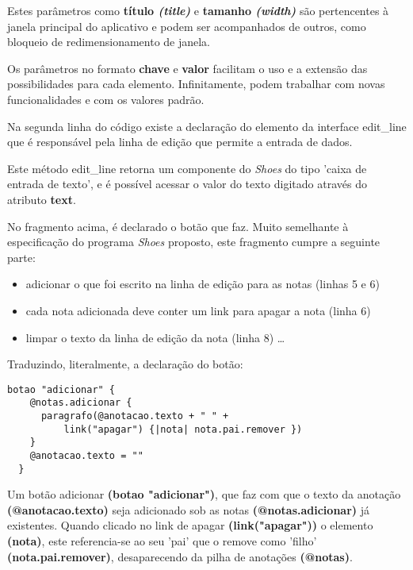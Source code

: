 \documentclass[espaco=simples,appendix=Name]{abnt}
\begin{document}
 

Estes parâmetros como \textbf{título \textit{(title)}} e \textbf{tamanho \textit{(width)}} são pertencentes à janela principal do aplicativo e podem ser acompanhados de outros, como bloqueio de redimensionamento de janela.

Os parâmetros no formato \textbf{chave} e \textbf{valor} facilitam o uso e a extensão das possibilidades para cada elemento. Infinitamente, podem trabalhar com novas funcionalidades e com os valores padrão.

Na segunda linha do código existe a declaração do elemento da interface edit\_line que é responsável pela linha de edição que permite a entrada de dados.
 

Este método edit\_line retorna um componente do \textit{Shoes} do tipo 'caixa de entrada de texto', e é possível acessar o valor do texto digitado através do atributo \textbf{text}. 

 

No fragmento acima, é declarado o botão que faz. Muito semelhante à especificação do programa \textit{Shoes} proposto, este fragmento cumpre a seguinte parte: 

\begin{itemize} 
  \item adicionar o que foi escrito na linha de edição para as notas (linhas 5 e 6)
  \item cada nota adicionada deve conter um link para apagar a nota (linha 6)
  \item limpar o texto da linha de edição da nota (linha 8) \ldots
\end{itemize} 

Traduzindo, literalmente, a declaração do botão:

\begin{lstlisting}[caption=Botão adicionar - código traduzido]
  botao "adicionar" {  
    @notas.adicionar { 
      paragrafo(@anotacao.texto + " " + 
          link("apagar") {|nota| nota.pai.remover })
    }  
    @anotacao.texto = ""
  } 
\end{lstlisting}

Um botão adicionar \textbf{(botao "adicionar")}, que faz com que o texto da anotação \textbf{(@anotacao.texto)} seja adicionado sob as notas \textbf{(@notas.adicionar)} já existentes. Quando clicado no link de apagar \textbf{(link("apagar"))} o elemento \textbf{(nota)}, este referencia-se ao seu 'pai' que o remove como 'filho' \textbf{(nota.pai.remover)}, desaparecendo da pilha de anotações \textbf{(@notas)}.
\end{document}
